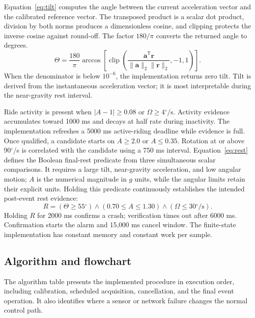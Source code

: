 \documentclass[10pt,a4paper]{article}
\newcommand{\degree}{\ensuremath{^{\circ}}}
\begin{document}
Equation~\eqref{eq:tilt} computes the angle between the current acceleration vector and the calibrated reference vector. The transposed product is a scalar dot product, division by both norms produces a dimensionless cosine, and clipping protects the inverse cosine against round-off. The factor $180/\pi$ converts the returned angle to degrees.
\begin{equation}\label{eq:tilt}
\Theta=\frac{180}{\pi}\arccos\!\left[\operatorname{clip}\left(\frac{\mathbf a^{\mathsf T}\mathbf r}{\|\mathbf a\|_2\|\mathbf r\|_2},-1,1\right)\right].
\end{equation}
When the denominator is below $10^{-6}$, the implementation returns zero tilt. Tilt is derived from the instantaneous acceleration vector; it is most interpretable during the near-gravity rest interval.

Ride activity is present when $|A-1|\geq0.08$ or $\Omega\geq4\degree$/s. Activity evidence accumulates toward 1000 ms and decays at half rate during inactivity. The implementation refreshes a 5000 ms active-riding deadline while evidence is full. Once qualified, a candidate starts on $A\geq2.0$ or $A\leq0.35$. Rotation at or above 90$\degree$/s is correlated with the candidate using a 750 ms interval. Equation~\eqref{eq:rest} defines the Boolean final-rest predicate from three simultaneous scalar comparisons. It requires a large tilt, near-gravity acceleration, and low angular motion; $A$ is the numerical magnitude in $g$ units, while the angular limits retain their explicit units. Holding this predicate continuously establishes the intended post-event rest evidence:
\begin{equation}
 \label{eq:rest} R=(\Theta\geq55\degree)\land(0.70\leq A\leq1.30)\land(\Omega\leq30\degree/\mathrm{s}).
\end{equation}
Holding $R$ for 2000 ms confirms a crash; verification times out after 6000 ms. Confirmation starts the alarm and 15,000 ms cancel window. The finite-state implementation has constant memory and constant work per sample.

\subsection{Algorithm and flowchart}
The algorithm table presents the implemented procedure in execution order, including calibration, scheduled acquisition, cancellation, and the final event operation. It also identifies where a sensor or network failure changes the normal control path.
\end{document}
